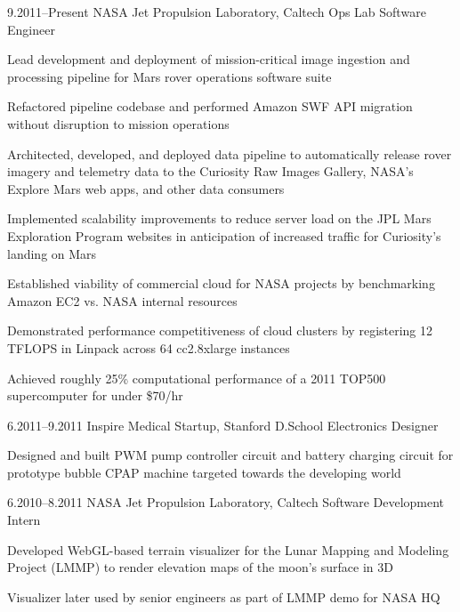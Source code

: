 \documentclass{dvshkn-resume}
\begin{document}
\begin{resumebody}
\sectionbody
{
    \newentry
    {9.2011--Present}
    {NASA Jet Propulsion Laboratory, Caltech}
    {Ops Lab Software Engineer}
    {
        \begin{compactitem}
            \item Lead development and deployment of mission-critical image ingestion and processing pipeline for Mars rover operations software suite
            \item Refactored pipeline codebase and performed Amazon SWF API migration without disruption to mission operations
        \end{compactitem}

        \begin{compactitem}
            \item Architected, developed, and deployed data pipeline to automatically release rover imagery and telemetry data to the Curiosity Raw Images Gallery, NASA's Explore Mars web apps, and other data consumers
            \item Implemented scalability improvements to reduce server load on the JPL Mars Exploration Program websites in anticipation of increased traffic for Curiosity's landing on Mars
        \end{compactitem}

        \begin{compactitem}
            \item Established viability of commercial cloud for NASA projects by benchmarking Amazon EC2 vs. NASA internal resources
            \item Demonstrated performance competitiveness of cloud clusters by registering 12 TFLOPS in Linpack across 64 cc2.8xlarge instances
            \item Achieved roughly 25\% computational performance of a 2011 TOP500 supercomputer for under \$70/hr
        \end{compactitem}
    }
    \newentry
    {6.2011--9.2011}
    {Inspire Medical Startup, Stanford D.School}
    {Electronics Designer}
    {
        \begin{compactitem}
            \item Designed and built PWM pump controller circuit and battery charging circuit for prototype bubble CPAP machine targeted towards the developing world
        \end{compactitem}
    }
    \newentry
    {6.2010--8.2011}
    {NASA Jet Propulsion Laboratory, Caltech}
    {Software Development Intern}
    {
        \begin{compactitem}
            \item Developed WebGL-based terrain visualizer for the Lunar Mapping and Modeling Project (LMMP) to render elevation maps of the moon's surface in 3D
            \item Visualizer later used by senior engineers as part of LMMP demo for NASA HQ
        \end{compactitem}
    }
}


\end{resumebody}
\end{document}
